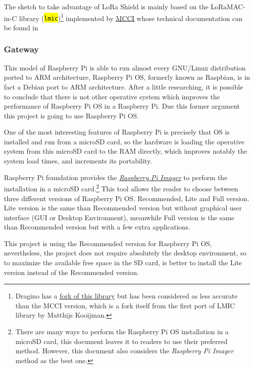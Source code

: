 \documentclass[11pt,a4paper,dvipsnames,twoside]{article}
\newcounter{subsubsubsection}[subsubsection]
\newcommand{\doubt}[1] {\textbf{\color{Red3}#1}}
\newcommand{\cmd}[1] {\hl{\texttt{#1}}}
\begin{document}
The sketch to take advantage of LoRa Shield is mainly based on the LoRaMAC-in-C library (\cmd{lmic})\footnote{Dragino has a \href{https://github.com/dragino/arduino-lmic}{fork of this library} but has been considered as less accurate than the MCCI version, which is a fork itself from the first port of LMIC library by Matthijs Kooijman.} implemented by \href{https://mcci.com/}{MCCI} whose technical documentation can be found in \cite{MCCI_lmic}

\doubt{}

\subsubsection{Gateway}

This model of Raspberry Pi is able to run almost every GNU/Linux distribution ported to ARM architecture, Raspberry Pi OS, formerly known as Raspbian,\cite{RaspberryPiOs} is in fact a Debian port to ARM architecture. After a little researching, it is possible to conclude that there is not other operative system which improves the performance of Raspberry Pi OS in a Raspberry Pi. Due this former argument this project is going to use Raspberry Pi OS. 

One of the most interesting features of Raspberry Pi is precisely that OS is installed and run from a microSD card, so the hardware is loading the operative system from this microSD card to the RAM directly, which improves notably the system load times, and increments its portability.

Raspberry Pi foundation provides the \href{https://www.raspberrypi.org/downloads/noobs/}{\textit{Raspberry Pi Imager}} to perform the installation in a microSD card.\footnote{There are many ways to perform the Raspberry Pi OS installation in a microSD card, this document leaves it to readers to use their preferred method. However, this document also considers the \textit{Raspberry Pi Imager} method as the best one.} This tool allows the reader to choose between three different versions of Raspberry Pi OS. Recommended, Lite and Full version. Lite version is the same than Recommended version but without graphical user interface (GUI or Desktop Environment), meanwhile Full version is the same than Recommended version but with a few extra applications. 

This project is using the Recommended version for Raspberry Pi OS, nevertheless, the project does not require absolutely the desktop environment, so to maximize the available free space in the SD card, is better to install the Lite version instead of the Recommended version. 
\end{document}
